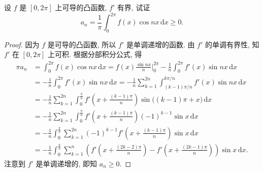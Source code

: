 \documentclass[../../main.tex]{subfiles}%
\begin{document}
\begin{example}
设 \( f \) 是 \( [0, 2\pi] \) 上可导的凸函数, \( f' \) 有界, 试证  
\[
a_n = \frac{1}{\pi} \int_{0}^{2\pi} f(x) \cos nx \, \mathrm{d}x \geqslant 0.
\]  
\end{example}
\begin{proof}
因为 \( f \) 是可导的凸函数, 所以 \( f' \) 是单调递增的函数. 由 \( f' \) 的单调有界性, 知 \( f' \) 在 \( [0, 2\pi] \) 上可积. 根据分部积分公式, 得  
\[
\begin{aligned}
\pi a_n &= \int_{0}^{2\pi} f(x) \cos nx \, \mathrm{d}x = f(x) \frac{\sin nx}{n} \bigg|_{0}^{2\pi} - \frac{1}{n} \int_{0}^{2\pi} f'(x) \sin nx \, \mathrm{d}x \\
&= -\frac{1}{n} \int_{0}^{2\pi} f'(x) \sin nx \, \mathrm{d}x = -\frac{1}{n} \sum_{k=1}^{2n} \int_{(k - 1)\pi/n}^{k\pi/n} f'(x) \sin nx \, \mathrm{d}x \\
&= -\frac{1}{n} \sum_{k=1}^{2n} \int_{0}^{\frac{\pi}{n}} f' \left( x + \frac{(k - 1)\pi}{n} \right) \sin \big( (k - 1)\pi + x \big) \, \mathrm{d}x \\
&= -\frac{1}{n} \sum_{k=1}^{2n} \int_{0}^{\frac{\pi}{n}} f' \left( x + \frac{(k - 1)\pi}{n} \right) (-1)^{k - 1} \sin x \, \mathrm{d}x \\
&= -\frac{1}{n} \int_{0}^{\frac{\pi}{n}} \sum_{k=1}^{2n} (-1)^{k - 1} f' \left( x + \frac{(k - 1)\pi}{n} \right) \sin x \, \mathrm{d}x \\
&= -\frac{1}{n} \int_{0}^{\frac{\pi}{n}} \sum_{k=1}^{n} \left( f' \left( x + \frac{(2k - 2)\pi}{n} \right) - f' \left( x + \frac{(2k - 1)\pi}{n} \right) \right) \sin x \, \mathrm{d}x.
\end{aligned}
\]  
注意到 \( f' \) 是单调递增的, 即知 \( a_n \geqslant 0 \).
\end{proof}
\end{document}
